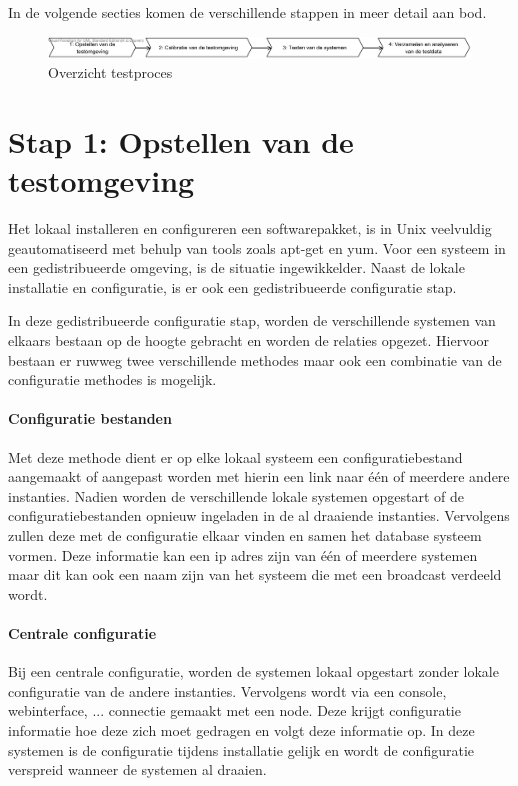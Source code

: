In de volgende secties komen de verschillende stappen in meer detail aan bod.  
\begin{figure}[ht!]
\centering
\includegraphics[width=\linewidth]{img/Test-Process-Overview}
\caption{Overzicht testproces}
\label{fig:test-process-overview}
\end{figure}

\section{Stap 1: Opstellen van de testomgeving}
Het lokaal installeren en configureren een softwarepakket, is in Unix veelvuldig geautomatiseerd met behulp van tools zoals \gls{apt-get} en \gls{yum}. Voor een systeem in een gedistribueerde omgeving, is de situatie ingewikkelder. Naast de lokale installatie en configuratie, is er ook een gedistribueerde configuratie stap.  

In deze gedistribueerde configuratie stap, worden de verschillende systemen van elkaars bestaan op de hoogte gebracht en worden de relaties opgezet. Hiervoor bestaan er ruwweg twee verschillende methodes maar ook een combinatie van de configuratie methodes is mogelijk.
 
\paragraph{Configuratie bestanden} Met deze methode dient er op elke lokaal systeem een configuratiebestand aangemaakt of aangepast worden met hierin een link naar één of meerdere andere instanties. Nadien worden de verschillende lokale systemen opgestart of de configuratiebestanden opnieuw ingeladen in de al draaiende instanties. Vervolgens zullen deze met de configuratie elkaar vinden en samen het database systeem vormen. Deze informatie kan een ip adres zijn van één of meerdere systemen maar dit kan ook een naam zijn van het systeem die met een broadcast verdeeld wordt. 
\paragraph{Centrale configuratie} Bij een centrale configuratie, worden de systemen lokaal opgestart zonder lokale configuratie van de andere instanties. Vervolgens wordt via een console, webinterface, ... connectie gemaakt met een node. Deze krijgt configuratie informatie hoe deze zich moet gedragen en volgt deze informatie op. In deze systemen is de configuratie tijdens installatie gelijk en wordt de configuratie verspreid wanneer de systemen al draaien.  


